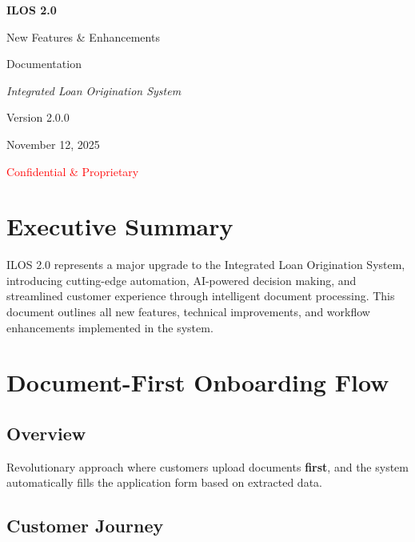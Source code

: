 \documentclass[12pt,a4paper]{article}
\begin{document}
\begin{titlepage}
    \centering
    \vspace*{2cm}
    {\Huge\bfseries ILOS 2.0\par}
    \vspace{0.5cm}
    {\LARGE New Features \& Enhancements\par}
    \vspace{0.5cm}
    {\Large Documentation\par}
    \vspace{2cm}
    {\Large\itshape Integrated Loan Origination System\par}
    \vfill
    {\large Version 2.0.0\par}
    {\large November 12, 2025\par}
    \vspace{1cm}
    {\large\textcolor{red}{Confidential \& Proprietary}\par}
\end{titlepage}

\tableofcontents
\newpage

\section*{Executive Summary}

ILOS 2.0 represents a major upgrade to the Integrated Loan Origination System, introducing cutting-edge automation, AI-powered decision making, and streamlined customer experience through intelligent document processing. This document outlines all new features, technical improvements, and workflow enhancements implemented in the system.

\newpage

\section{Document-First Onboarding Flow}

\subsection{Overview}
Revolutionary approach where customers upload documents \textbf{first}, and the system automatically fills the application form based on extracted data.

\subsection{Customer Journey}
\end{document}

